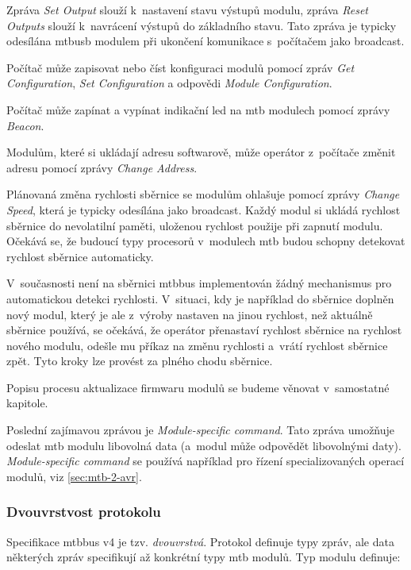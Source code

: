 Zpráva \textit{Set Output} slouží k~nastavení stavu výstupů modulu, zpráva
\textit{Reset Outputs} slouží k~navrácení výstupů do základního stavu.
Tato zpráva je typicky odesílána \gls{mtbusb} modulem při ukončení komunikace
s~počítačem jako broadcast.

Počítač může zapisovat nebo číst konfiguraci modulů pomocí zpráv
\textit{Get Configuration}, \textit{Set Configuration} a odpovědi
\textit{Module Configuration}.

Počítač může zapínat a vypínat indikační \gls{led} na \gls{mtb} modulech pomocí
zprávy \textit{Beacon}.

Modulům, které si ukládají adresu softwarově, může operátor z~počítače změnit
adresu pomocí zprávy \textit{Change Address}.

Plánovaná změna rychlosti sběrnice se modulům ohlašuje pomocí zprávy
\textit{Change Speed}, která je typicky odesílána jako broadcast. Každý modul
si ukládá rychlost sběrnice do nevolatilní paměti, uloženou rychlost použije při
zapnutí modulu. Očekává se, že budoucí typy procesorů v~modulech \gls{mtb} budou
schopny detekovat rychlost sběrnice automaticky.

V~současnosti není na sběrnici \gls{mtbbus} implementován žádný mechanismus pro
automatickou detekci rychlosti.  V~situaci, kdy je například do sběrnice
doplněn nový modul, který je ale z~výroby nastaven na jinou rychlost, než
aktuálně sběrnice používá, se očekává, že operátor přenastaví rychlost sběrnice
na rychlost nového modulu, odešle mu příkaz na změnu rychlosti
a~vrátí rychlost sběrnice zpět. Tyto kroky lze provést za plného chodu sběrnice.

Popisu procesu aktualizace firmwaru modulů se budeme věnovat v~samostatné
kapitole.

Poslední zajímavou zprávou je \textit{Module-specific command}. Tato zpráva
umožňuje odeslat \gls{mtb} modulu libovolná data (a~modul může odpovědět
libovolnými daty). \textit{Module-specific command} se používá například pro
řízení specializovaných operací modulů, viz \ref{sec:mtb-2-avr}.


\subsubsection{Dvouvrstvost protokolu}

Specifikace \gls{mtbbus} v4 je tzv. \textit{dvouvrstvá}. Protokol definuje
typy zpráv, ale data některých zpráv specifikují až konkrétní typy \gls{mtb}
modulů. Typ modulu definuje:

